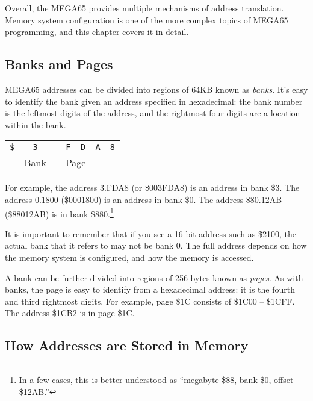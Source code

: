Overall, the MEGA65 provides multiple mechanisms of address translation. Memory
system configuration is one of the more complex topics of MEGA65 programming,
and this chapter covers it in detail.

\subsection{Banks and Pages}

MEGA65 addresses can be divided into regions of 64KB known as {\em banks}. It's
easy to identify the bank given an address specified in hexadecimal: the bank
number is the leftmost digits of the address, and the rightmost four digits are
a location within the bank.

\medskip
\begin{center}
\begin{tabular}{m{0.4cm}m{0.4cm}m{0.05cm}m{0.4cm}m{0.4cm}m{0.4cm}m{0.4cm}}
\multicolumn{1}{c}{\huge\texttt{\$}} &
\multicolumn{1}{c}{\huge\texttt{3}} &
\multicolumn{1}{c}{ } &
\multicolumn{1}{c}{\huge\texttt{F}} &
\multicolumn{1}{c}{\huge\texttt{D}} &
\multicolumn{1}{c}{\huge\texttt{A}} &
\multicolumn{1}{c}{\huge\texttt{8}} \\
\cline{2-2}\cline{4-5}
& \multicolumn{1}{c}{\small Bank} & & \multicolumn{2}{c}{\small Page} &
\multicolumn{2}{c}{ } \\
\end{tabular}
\end{center}
\medskip

For example, the address 3.FDA8 (or \$003FDA8) is an address in bank \$3. The
address 0.1800 (\$0001800) is an address in bank \$0. The address 880.12AB
(\$88012AB) is in bank \$880.\footnote{In a few cases, this is better understood as
``megabyte \$88, bank \$0, offset \$12AB.''}

It is important to remember that if you see a 16-bit
address such as \$2100, the actual bank that it refers to may not be bank 0.
The full address depends on how the memory system is configured, and how the
memory is accessed.

A bank can be further divided into regions of 256 bytes known as {\em pages}.
As with banks, the page is easy to identify from a hexadecimal address: it is
the fourth and third rightmost digits. For example, page \$1C consists of
\$1C00 -- \$1CFF. The address \$1CB2 is in page \$1C.

\subsection{How Addresses are Stored in Memory}


